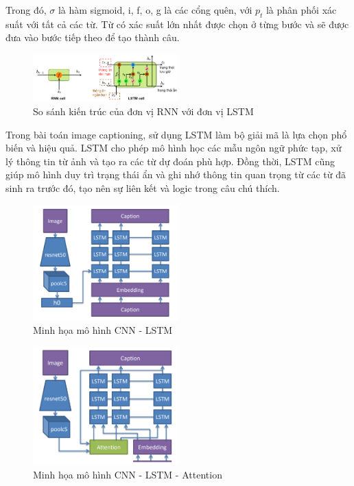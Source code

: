 \documentclass[conference]{IEEEtran}
\begin{document}
Trong đó, $\sigma$ là hàm sigmoid, i, f, o, g là các cổng quên, với $p_t$ là phân phối xác suất với tất cả các từ. Từ có xác suất lớn nhất được chọn ở từng bước và sẽ được đưa vào bước tiếp theo để tạo thành câu. 

\begin{figure}[h]
\includegraphics[width=0.5\textwidth]{assets/RNN_LSTM_compare.png}
  \caption{So sánh kiến trúc của đơn vị RNN với đơn vị LSTM}
  \label{fig:RNN_LSTM_compare}
\end{figure}

Trong bài toán image captioning, sử dụng LSTM làm bộ giải mã là lựa chọn phổ biến và hiệu quả.
LSTM cho phép mô hình học các mẫu ngôn ngữ phức tạp, xử lý thông tin từ ảnh và tạo ra các từ dự đoán phù hợp.
Đồng thời, LSTM cũng giúp mô hình duy trì trạng thái ẩn và ghi nhớ thông tin quan trọng từ các từ đã sinh ra trước đó, tạo nên sự liên kết và logic trong câu chú thích.

\begin{figure}[h]
\includegraphics[width=0.5\textwidth]{assets/architecture_CNN_LSTM.png}
  \caption{Minh họa mô hình CNN - LSTM}
  \label{fig:CNN_LSTM}
\end{figure}

\begin{figure}[h]
\includegraphics[width=0.5\textwidth]{assets/architecture_CNN_LSTM_attention.png}
  \caption{Minh họa mô hình CNN - LSTM - Attention}
  \label{fig:CNN_LSTM_Attention}
\end{figure}
\end{document}
